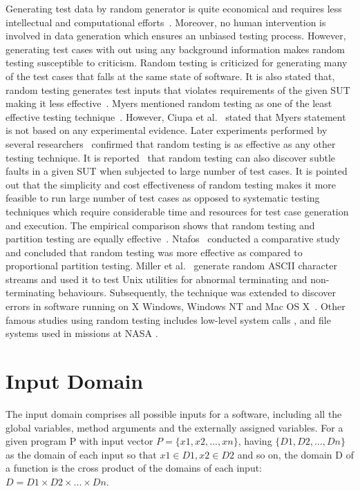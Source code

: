 Generating test data by random generator is quite economical and requires less intellectual and computational efforts~\cite{ciupa2008artoo}. Moreover, no human intervention is involved in data generation which ensures an unbiased testing process. However, generating test cases with out using any background information makes random testing susceptible to criticism. Random testing is criticized for generating many of the test cases that falls at the same state of software. It is also stated that, random testing generates test inputs that violates requirements of the given SUT making it less effective~\cite{pacheco2009directed, sen2007effective}. Myers mentioned random testing as one of the least effective testing technique~\cite{myers2011art}. However, Ciupa et al.~\cite{ciupa2007experimental} stated that Myers statement is not based on any experimental evidence. Later experiments performed by several researchers~\cite{ciupa2008finding, hamlet1994random,  leitner2007efficient, duran1981report} confirmed that random testing is as effective as any other testing technique. It is reported~\cite{duran1981report} that random testing can also discover subtle faults in a given SUT when subjected to large number of test cases. It is pointed out that the simplicity and cost effectiveness of random testing makes it more feasible to run large number of test cases as opposed to systematic testing techniques which require considerable time and resources for test case generation and execution. The empirical comparison shows that random testing and partition testing are equally effective~\cite{hamlet1990partition}. Ntafos~\cite{ntafos1998random} conducted a comparative study and concluded that random testing was more effective as compared to proportional partition testing. Miller et al.~\cite{miller1990empirical} generate random ASCII character streams and used it to test Unix utilities for abnormal terminating and non-terminating behaviours. Subsequently, the technique was extended to discover errors in software running on X Windows, Windows NT and Mac OS X~\cite{forrester2000empirical, miller2006empirical}. Other famous studies using random testing includes low-level system calls \cite{kropp1998automated}, and file systems used in missions at NASA \cite{groce2007randomized}.


\section{Input Domain} 
The input domain comprises all possible inputs for a software, including all the global variables, method arguments and the externally assigned variables. For a given program P with input vector $ P =\{x1, x2, . . . , xn\}$, having $\{D1, D2, . . . , Dn\}$ as the domain of each input so that $x1 \in D1, x2 \in D2$ and so on, the domain D of a function is the cross product of the domains of each input: $D = D1 \times D2 \times . . . \times Dn$.

